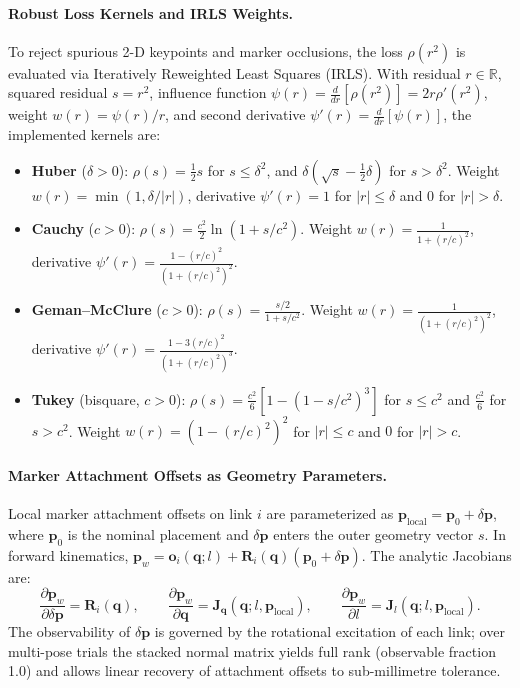 \documentclass[11pt,a4paper]{article}
\newcommand{\R}{\mathbb{R}}
\newcommand{\bq}{\mathbf{q}}
\begin{document}
\paragraph{Robust Loss Kernels and IRLS Weights.}
To reject spurious 2-D keypoints and marker occlusions, the loss $\rho(r^2)$ is evaluated
via Iteratively Reweighted Least Squares (IRLS). With residual $r \in \R$, squared residual $s = r^2$,
influence function $\psi(r) = \frac{d}{dr}[\rho(r^2)] = 2r \rho'(r^2)$, weight $w(r) = \psi(r)/r$,
and second derivative $\psi'(r) = \frac{d}{dr}[\psi(r)]$, the implemented kernels are:
\begin{itemize}[nosep]
  \item \textbf{Huber} ($\delta > 0$):
    $\rho(s) = \frac{1}{2}s$ for $s \le \delta^2$, and $\delta(\sqrt{s} - \frac{1}{2}\delta)$ for $s > \delta^2$.
    Weight $w(r) = \min(1, \delta/|r|)$, derivative $\psi'(r) = 1$ for $|r| \le \delta$ and $0$ for $|r| > \delta$.
  \item \textbf{Cauchy} ($c > 0$):
    $\rho(s) = \frac{c^2}{2}\ln(1 + s/c^2)$.
    Weight $w(r) = \frac{1}{1 + (r/c)^2}$, derivative $\psi'(r) = \frac{1 - (r/c)^2}{(1 + (r/c)^2)^2}$.
  \item \textbf{Geman--McClure} ($c > 0$):
    $\rho(s) = \frac{s/2}{1 + s/c^2}$.
    Weight $w(r) = \frac{1}{(1 + (r/c)^2)^2}$, derivative $\psi'(r) = \frac{1 - 3(r/c)^2}{(1 + (r/c)^2)^3}$.
  \item \textbf{Tukey} (bisquare, $c > 0$):
    $\rho(s) = \frac{c^2}{6}[1 - (1 - s/c^2)^3]$ for $s \le c^2$ and $\frac{c^2}{6}$ for $s > c^2$.
    Weight $w(r) = (1 - (r/c)^2)^2$ for $|r| \le c$ and $0$ for $|r| > c$.
\end{itemize}

\paragraph{Marker Attachment Offsets as Geometry Parameters.}
Local marker attachment offsets on link $i$ are parameterized as $\mathbf{p}_{\mathrm{local}} = \mathbf{p}_0 + \delta\mathbf{p}$,
where $\mathbf{p}_0$ is the nominal placement and $\delta\mathbf{p}$ enters the outer geometry vector $s$.
In forward kinematics, $\mathbf{p}_w = \mathbf{o}_i(\bq; l) + \mathbf{R}_i(\bq)(\mathbf{p}_0 + \delta\mathbf{p})$.
The analytic Jacobians are:
\begin{equation}
  \frac{\partial \mathbf{p}_w}{\partial \delta\mathbf{p}} = \mathbf{R}_i(\bq), \qquad
  \frac{\partial \mathbf{p}_w}{\partial \bq} = \mathbf{J}_{\bq}(\bq; l, \mathbf{p}_{\mathrm{local}}), \qquad
  \frac{\partial \mathbf{p}_w}{\partial l} = \mathbf{J}_l(\bq; l, \mathbf{p}_{\mathrm{local}}) .
\end{equation}
The observability of $\delta\mathbf{p}$ is governed by the rotational excitation of each link;
over multi-pose trials the stacked normal matrix yields full rank (observable fraction 1.0)
and allows linear recovery of attachment offsets to sub-millimetre tolerance.
\end{document}
